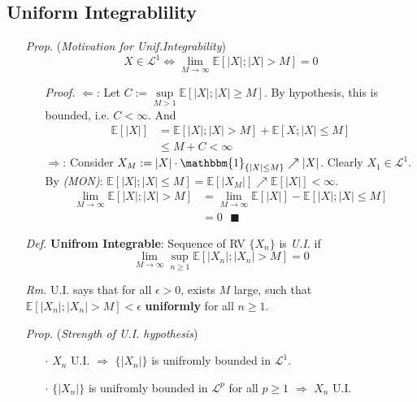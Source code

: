 \documentclass[a4paper,12pt,twoside]{book}
\begin{document}
\subsection{Uniform Integrablility}
\begin{itemize}
	\item[\textit{Prop.}] (\textit{Motivation for Unif.Integrability}) 
	$$X\in \mathcal{L}^1\iff\lim\limits_{M\rightarrow\infty}\mathbb{E}[|X|;|X|>M]=0$$
	\begin{itemize}
		\item[\textit{Proof.}] $\Leftarrow$: Let $C:=\sup\limits_{M>1}\mathbb{E}[|X|;|X|\geq M]$. By hypothesis, this is bounded, i.e. $C<\infty$. And
		\begin{equation}
			\begin{split}
				\mathbb{E}[|X|] &= \mathbb{E}[|X|;|X|>M]+\mathbb{E}[X;|X|\leq M]\\
				& \leq M+C < \infty
			\end{split}
		\end{equation}
		$\Rightarrow$: Consider $X_M:=|X|\cdot \mathbbm{1}_{\{|X|\leq M\}}\nearrow |X|$. Clearly $X_1\in \mathcal{L}^1$. By \textit{(MON)}: $\mathbb{E}[|X|;|X|\leq M]=\mathbb{E}[|X_M|]\nearrow \mathbb{E}[|X|]<\infty$.
		\begin{equation}
			\begin{split}
				\lim\limits_{M\rightarrow\infty}\mathbb{E}[|X|;|X|>M] &=
				\lim\limits_{M\rightarrow\infty}\mathbb{E}[|X|]-\mathbb{E}[|X|;|X|\leq M] \\
				&= 0~~~\blacksquare
			\end{split}
		\end{equation}
	\end{itemize}

	\item[\textit{Def.}] \textbf{Unifrom Integrable}: Sequence of RV $\{X_n\}$ is \textit{U.I.} if 
	\begin{equation}
		\lim\limits_{M\rightarrow\infty}\sup\limits_{n\geq 1}\mathbb{E}[|X_n|;|X_n|>M]=0
	\end{equation}

	\item[\textit{Rm.}] U.I. says that for all $\epsilon>0$, exists $M$ large, such that $\mathbb{E}[|X_n|;|X_n|>M]<\epsilon$ \textbf{uniformly} for all $n\geq 1$.

	\item[\textit{Prop.}] (\textit{Strength of U.I. hypothesis}) 
	\begin{itemize}
		\item[$\cdot$] ${X_n}$ U.I. $\Rightarrow$ $\{|X_n|\}$ is unifromly bounded in $\mathcal{L}^1$. 
		\item[$\cdot$] $\{|X_n|\}$ is unifromly bounded in $\mathcal{L}^p$ for all $p\geq 1$ $\Rightarrow$ ${X_n}$ U.I.


\end{itemize}
\end{itemize}
\end{document}
